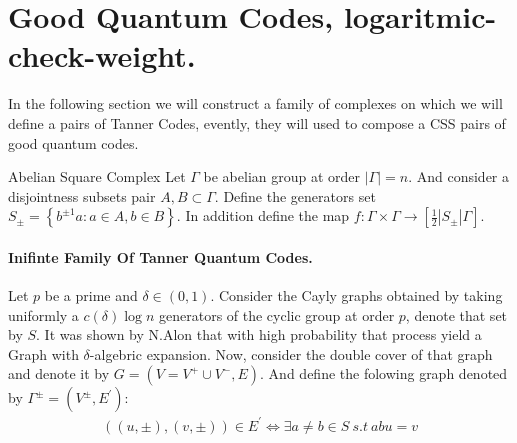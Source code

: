 \section{Good Quantum Codes, logaritmic-check-weight.} 
In the following section we will construct a family of complexes on which we will define a pairs of Tanner Codes, evently, they will used to compose a CSS pairs of good quantum codes.  

\begin{definition}{Abelian Square Complex}
  Let $\Gamma$ be abelian group at order $|\Gamma| = n$. And consider a disjointness subsets pair $A,B \subset \Gamma$. Define the generators set $S_{\pm}  = \left\{ b^{\pm 1} a : a \in A, b \in B   \right\}$. In addition define the map $f : \Gamma \times \Gamma \rightarrow \left[ \frac{1}{2} |S_{\pm}| \Gamma  \right]  $. 
\end{definition}

\paragraph{Inifinte Family Of Tanner Quantum Codes.} 
Let $p$ be a prime and $\delta \in \left( 0,1 \right)$. Consider the Cayly graphs obtained by taking uniformly a $c\left( \delta \right)\log n$ generators of the cyclic group at order $p$, denote that set by $S$. It was shown by N.Alon  that with high probability that process yield a Graph with $\delta$-algebric expansion. Now, consider the double cover of that graph and denote it by $G = \left( V = V^{+} \cup V^{-},E \right)$. And define the folowing graph denoted by $\Gamma^{\pm} = \left(V^{\pm}, E^{\prime}\right)$:
\begin{equation*}
  \begin{split}
    \left( \left(u , \pm  \right), \left( v, \pm \right) \right) \in  E^{\prime} \Leftrightarrow \exists a\neq b \in S \ s.t \ abu = v     
  \end{split}
\end{equation*}

